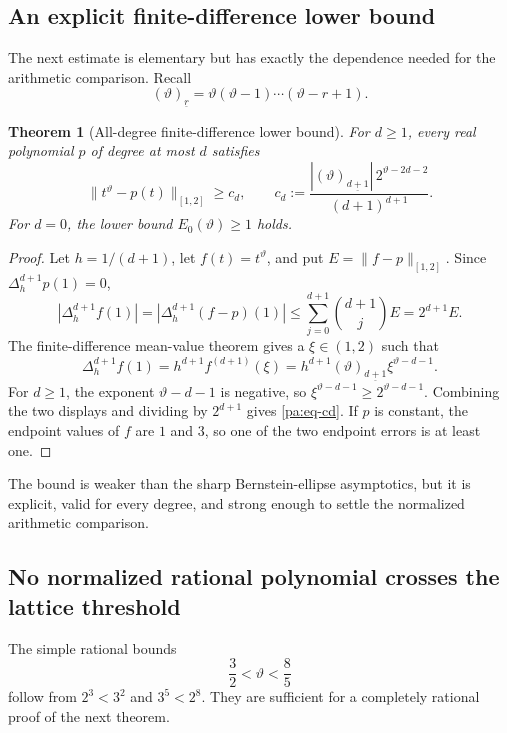 \documentclass[11pt,oneside]{article}
\newtheorem{theorem}{Theorem}[section]
\theoremstyle{definition}
\theoremstyle{remark}
\newcommand{\thetaq}{\vartheta}
\newcommand{\fall}[2]{\left(#1\right)_{\!\underline{#2}}}
\begin{document}
\subsection{An explicit finite-difference lower bound}

The next estimate is elementary but has exactly the dependence needed for the arithmetic
comparison.  Recall
\[
 \fall{\thetaq}{r}=\thetaq(\thetaq-1)\cdots(\thetaq-r+1).
\]

\begin{theorem}[All-degree finite-difference lower bound]
\label{pa:thm-fd-lower}
For \(d\ge1\), every real polynomial \(p\) of degree at most \(d\) satisfies
\begin{equation}
 \bigl\|t^{\thetaq}-p(t)\bigr\|_{[1,2]}
 \ge c_d,
 \qquad
 c_d:=
 \frac{|\fall{\thetaq}{d+1}|\,2^{\thetaq-2d-2}}
 {(d+1)^{d+1}}.
 \label{pa:eq-cd}
\end{equation}
For \(d=0\), the lower bound \(E_0(\thetaq)\ge1\) holds.
\end{theorem}

\begin{proof}
Let \(h=1/(d+1)\), let \(f(t)=t^{\thetaq}\), and put
\(E=\|f-p\|_{[1,2]}\).  Since \(\Delta_h^{d+1}p(1)=0\),
\[
 |\Delta_h^{d+1}f(1)|
 =|\Delta_h^{d+1}(f-p)(1)|
 \le\sum_{j=0}^{d+1}\binom{d+1}{j}E
 =2^{d+1}E.
\]
The finite-difference mean-value theorem gives a \(\xi\in(1,2)\) such that
\[
 \Delta_h^{d+1}f(1)
 =h^{d+1}f^{(d+1)}(\xi)
 =h^{d+1}\fall{\thetaq}{d+1}\xi^{\thetaq-d-1}.
\]
For \(d\ge1\), the exponent \(\thetaq-d-1\) is negative, so
\(
 \xi^{\thetaq-d-1}\ge2^{\thetaq-d-1}
\).
Combining the two displays and dividing by \(2^{d+1}\) gives
\eqref{pa:eq-cd}.  If \(p\) is constant, the endpoint values of \(f\) are \(1\) and \(3\),
so one of the two endpoint errors is at least one.
\end{proof}

The bound is weaker than the sharp Bernstein-ellipse asymptotics, but it is explicit, valid
for every degree, and strong enough to settle the normalized arithmetic comparison.

\subsection{No normalized rational polynomial crosses the lattice threshold}

The simple rational bounds
\begin{equation}
 \frac32<\thetaq<\frac85
 \label{pa:eq-theta-rational-bounds}
\end{equation}
follow from \(2^3<3^2\) and \(3^5<2^8\).  They are sufficient for a completely rational proof
of the next theorem.
\end{document}

